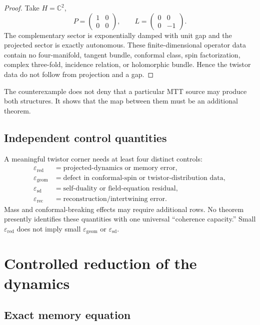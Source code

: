 \documentclass[11pt]{article}
\begin{document}
\begin{proof}
Take \(H=\mathbb{C}^2\),
\[
P=\begin{pmatrix}1&0\\0&0\end{pmatrix},
\qquad
L=\begin{pmatrix}0&0\\0&-1\end{pmatrix}.
\]
The complementary sector is exponentially damped with unit gap and the
projected sector is exactly autonomous. These finite-dimensional operator
data contain no four-manifold, tangent bundle, conformal class, spin
factorization, complex three-fold, incidence relation, or holomorphic
bundle. Hence the twistor data do not follow from projection and a gap.
\end{proof}

The counterexample does not deny that a particular MTT source may produce
both structures. It shows that the map between them must be an additional
theorem.

\subsection{Independent control quantities}

A meaningful twistor corner needs at least four distinct controls:
\begin{align}
\varepsilon_{\mathrm{red}}
&=\text{projected-dynamics or memory error},\\
\varepsilon_{\mathrm{geom}}
&=\text{defect in conformal-spin or twistor-distribution data},\\
\varepsilon_{\mathrm{sd}}
&=\text{self-duality or field-equation residual},\\
\varepsilon_{\mathrm{rec}}
&=\text{reconstruction/intertwining error}.
\end{align}
Mass and conformal-breaking effects may require additional rows. No theorem
presently identifies these quantities with one universal ``coherence
capacity.'' Small \(\varepsilon_{\mathrm{red}}\) does not imply small
\(\varepsilon_{\mathrm{geom}}\) or \(\varepsilon_{\mathrm{sd}}\).

\section{Controlled reduction of the dynamics}

\subsection{Exact memory equation}
\end{document}
